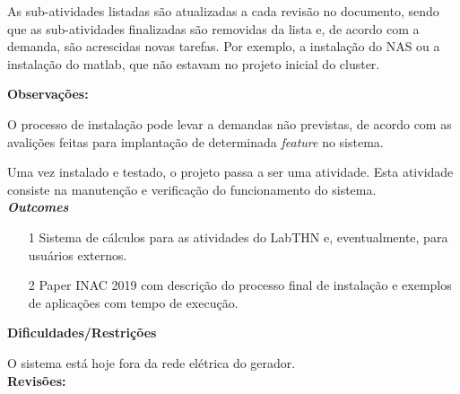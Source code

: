 As sub-atividades listadas são atualizadas a cada revisão no documento, sendo que 
as sub-atividades finalizadas são removidas da lista e, de acordo com a demanda, 
são acrescidas novas tarefas. Por exemplo, a instalação do NAS ou a instalação do 
matlab, que não estavam no projeto inicial do cluster.

\textbf{Observações:}

O processo de instalação pode levar a demandas não previstas, de acordo com as avalições feitas para implantação de determinada \textit{feature} no sistema.

Uma vez instalado e testado, o projeto passa a ser uma atividade. Esta atividade 
consiste na manutenção e verificação do funcionamento do sistema.\\

\textbf{\textit{Outcomes}}

\begin{itemize}
	\item[1] Sistema de cálculos para as atividades do LabTHN e, eventualmente, para usuários externos.
	\item[2] Paper INAC 2019 com descrição do processo final de instalação e exemplos de aplicações com tempo de execução.

\end{itemize}


\textbf{Dificuldades/Restrições}

O sistema está hoje fora da rede elétrica do gerador.\\

\textbf{Revisões:}\\
\date{21 de novembro de 2018}\\
\date{30 de novembro de 2018}\\
\date{07 de dezembro de 2018}

